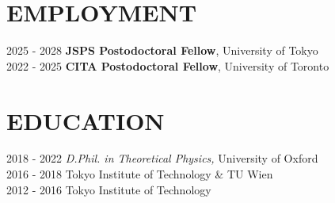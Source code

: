 \documentclass[]{res}
\begin{document}
\begin{resume}

\section{EMPLOYMENT}
\noindent
\begin{tabbing}
    2025 - 2028 \hspace{2mm} \=\textbf{JSPS Postodoctoral Fellow}, University of Tokyo\\
    2022 - 2025 \hspace{2mm} \=\textbf{CITA Postodoctoral Fellow}, University of Toronto
\end{tabbing}

\section{EDUCATION}
\noindent
\begin{tabbing}
    2018 - 2022 \hspace{2mm} \={\sl D.Phil. in Theoretical Physics,} University of Oxford\\
    2016 - 2018 \hspace{2mm}  Tokyo Institute of Technology \& TU Wien\\ 
    2012 - 2016 \hspace{2mm}  Tokyo Institute of Technology
\end{tabbing}


\end{resume}
\end{document}
